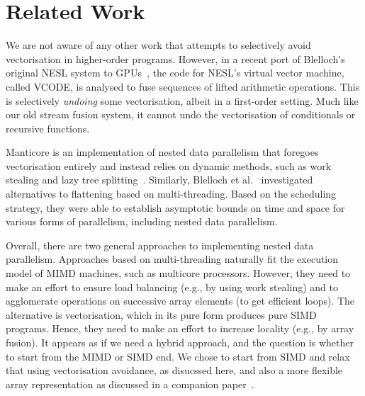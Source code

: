 \section{Related Work}
\label{sec:related}

We are not aware of any other work that attempts to selectively avoid vectorisation in higher-order programs. However, in a recent port of Blelloch's original NESL system to GPUs~\cite{bergstrom-reppy:ndp-gpu}, the code for NESL's virtual vector machine, called VCODE, is analysed to fuse sequences of lifted arithmetic operations. This is selectively \emph{undoing} some vectorisation, albeit in a first-order setting. Much like our old stream fusion system, it cannot undo the vectorisation of conditionals or recursive functions.

Manticore is an implementation of nested data parallelism that foregoes vectorisation entirely and instead relies on dynamic methods, such as work stealing and lazy tree splitting~\cite{bergstrom-etal:lts}. Similarly, Blelloch et al.~\cite{BGM99,Spoonhower:2010} investigated alternatives to flattening based on multi-threading. Based on the scheduling strategy, they were able to establish asymptotic bounds on time and space for various forms of parallelism, including nested data parallelism. 

Overall, there are two general approaches to implementing nested data parallelism. Approaches based on multi-threading naturally fit the execution model of MIMD machines, such as multicore processors. However, they need to make an effort to ensure load balancing (e.g., by using work stealing) and to agglomerate operations on successive array elements (to get efficient loops). The alternative is vectorisation, which in its pure form produces pure SIMD programs. Hence, they need to make an effort to increase locality (e.g., by array fusion). It appears as if we need a hybrid approach, and the question is whether to start from the MIMD or SIMD end. We chose to start from SIMD and relax that using vectorisation avoidance, as disucssed here, and also a more flexible array representation as discussed in a companion paper~\cite{lippmeier:work-efficient}.